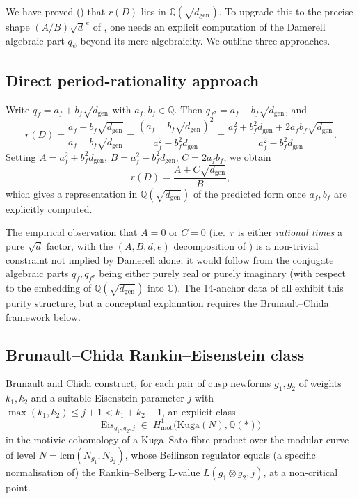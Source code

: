 \documentclass[11pt]{amsart}
\theoremstyle{definition}
\theoremstyle{remark}
\newcommand{\Q}{\mathbb{Q}}
\newcommand{\C}{\mathbb{C}}
\begin{document}
We have proved () that \(r(D)\) lies in
\(\Q(\sqrt{d_{\mathrm{gen}}})\). To upgrade this to the precise
shape \((A/B)\sqrt{d}^{\,e}\) of , one needs an
explicit computation of the Damerell algebraic part \(q_{\psi}\)
beyond its mere algebraicity. We outline three approaches.

\subsection{Direct period-rationality approach}

Write \(q_{f} = a_{f} + b_{f}\sqrt{d_{\mathrm{gen}}}\) with
\(a_{f}, b_{f} \in \Q\). Then
\(q_{f^{\sigma}} = a_{f} - b_{f}\sqrt{d_{\mathrm{gen}}}\), and
\[
   r(D) = \frac{a_{f} + b_{f}\sqrt{d_{\mathrm{gen}}}}
                {a_{f} - b_{f}\sqrt{d_{\mathrm{gen}}}}
        = \frac{(a_{f} + b_{f}\sqrt{d_{\mathrm{gen}}})^{2}}
                {a_{f}^{2} - b_{f}^{2} d_{\mathrm{gen}}}
        = \frac{a_{f}^{2} + b_{f}^{2} d_{\mathrm{gen}}
                + 2 a_{f} b_{f} \sqrt{d_{\mathrm{gen}}}}
                {a_{f}^{2} - b_{f}^{2} d_{\mathrm{gen}}}.
\]
Setting
\(A = a_{f}^{2} + b_{f}^{2} d_{\mathrm{gen}}\),
\(B = a_{f}^{2} - b_{f}^{2} d_{\mathrm{gen}}\),
\(C = 2 a_{f} b_{f}\), we obtain
\[
   r(D) = \frac{A + C \sqrt{d_{\mathrm{gen}}}}{B} ,
\]
which gives a representation in \(\Q(\sqrt{d_{\mathrm{gen}}})\) of
the predicted form once \(a_{f}, b_{f}\) are explicitly computed.

The empirical observation that \(A = 0\) or \(C = 0\) (i.e.\ \(r\)
is either \emph{rational times} a pure \(\sqrt{d}\) factor, with the
\((A, B, d, e)\) decomposition of ) is a
non-trivial constraint not implied by Damerell alone; it would
follow from the conjugate algebraic parts
\(q_{f}, q_{f^{\sigma}}\) being either purely real or purely
imaginary (with respect to the embedding of
\(\Q(\sqrt{d_{\mathrm{gen}}})\) into \(\C\)). The 14-anchor data of
 all exhibit this purity structure, but a
conceptual explanation requires the Brunault--Chida framework
below.

\subsection{Brunault--Chida Rankin--Eisenstein class}

Brunault and Chida \cite{BrunaultChida2015} construct, for each pair
of cusp newforms \(g_{1}, g_{2}\) of weights \(k_{1}, k_{2}\) and a
suitable Eisenstein parameter \(j\) with
\(\max(k_{1}, k_{2}) \le j + 1 < k_{1} + k_{2} - 1\), an explicit
class
\[
   \mathrm{Eis}_{g_{1}, g_{2}, j}
   \;\in\;
   H^{1}_{\mathrm{mot}}\bigl(\mathrm{Kuga}(N), \Q(\ast)\bigr)
\]
in the motivic cohomology of a Kuga--Sato fibre product over the
modular curve of level \(N = \mathrm{lcm}(N_{g_{1}}, N_{g_{2}})\),
whose Beilinson regulator equals (a specific normalisation of) the
Rankin--Selberg L-value
\(L(g_{1} \otimes g_{2}, j)\), at a non-critical point.
\end{document}
